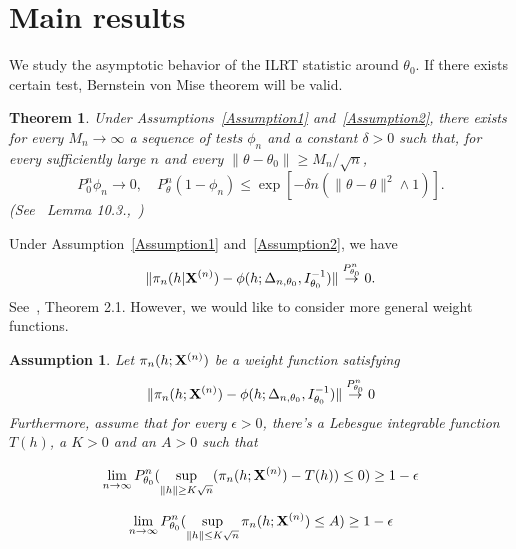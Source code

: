 \documentclass[3p]{elsarticle}
\theoremstyle{plain}
\newtheorem{theorem}{\quad\quad Theorem}
\newtheorem{assumption}{\quad\quad Assumption}
\theoremstyle{definition}
\theoremstyle{remark}
\begin{document}
\section{Main results}


We study the asymptotic behavior of the ILRT statistic around $\theta_0$.
If there exists certain test, Bernstein von Mise theorem will be valid.
\begin{theorem}\label{Thm:someTest}
    Under Assumptions~\ref{Assumption1} and~\ref{Assumption2},
    there exists for every $M_n\to \infty$ a sequence of tests $\phi_n$ and a constant $\delta>0$ such that, for every sufficiently large $n$ and every $\|\theta-\theta_0\|\geq M_n/\sqrt{n}$,
    $$
    P^n_{0} \phi_n\to 0,\quad
    P^n_{\theta} (1-\phi_n)\leq \exp[-\delta n(\|\theta-\theta\|^2\wedge 1)].
    $$
    (See~\cite{van2000asymptotic} Lemma 10.3.,~\cite{Kleijn2012The})
\end{theorem}
Under Assumption~\ref{Assumption1} and~\ref{Assumption2}, we have 
$$
            \|\pi_n(h|\mathbf{X}^{(n)})-\phi(h;\Delta_{n,\theta_0},I_{\theta_0}^{-1})\|\overset{P_{\theta_0}^n}{\to}0.
$$
See~\cite{Kleijn2012The}, Theorem 2.1.
However, we would like to consider more general weight functions.
        
\begin{assumption}\label{Assumption3}
    Let $\pi_n(h;\mathbf{X}^{(n)})$ be a weight function satisfying 
        \begin{equation}\label{vonMisesResults}
            \|\pi_n(h;\mathbf{X}^{(n)})-\phi(h;\Delta_{n,\theta_0},I_{\theta_0}^{-1})\|\overset{P_{\theta_0}^n}{\to}0
        \end{equation}
Furthermore, assume that for every $\epsilon>0$, there's a Lebesgue integrable function $T(h)$, a $K>0$ and an $A>0$ such that 

    \begin{equation}\label{Assump31}
        \lim_{n\to \infty}P_{\theta_0}^n(\sup_{\|h\|\geq K\sqrt{n}}(\pi_n(h;\mathbf{X}^{(n)})-T(h))\leq 0)\geq 1-\epsilon
\end{equation}

        \begin{equation}\label{Assump32}
            \lim_{n\to \infty} P_{\theta_0}^n(\sup_{\|h\|\leq K\sqrt{n}} \pi_n(h;\mathbf{X}^{(n)})\leq A)\geq 1-\epsilon
        \end{equation}
\end{assumption}
\end{document}
